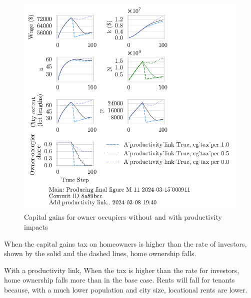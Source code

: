\begin{figure}[h!tb]
    \includegraphics[scale=.75, trim={0 1.4cm 3.5cm 0},clip]{fig/With-productivity_link_cg_tax_per-000911.pdf} 
    \caption{Capital gains for owner occupiers without and with productivity impacts}
    \label{fig:CG-pers_link_W-WO-Cost-of-capital}
\end{figure}

When the capital gains tax on homeowners is higher than the rate of investors, shown by the solid and the dashed lines,  home ownership falls. 

With a productivity link,  When the tax is higher than the rate for investors,  home ownership falls more than in the base case.  Rents will fall for tenants because, with a much lower population and city size, locational rents are lower.

\newpage
